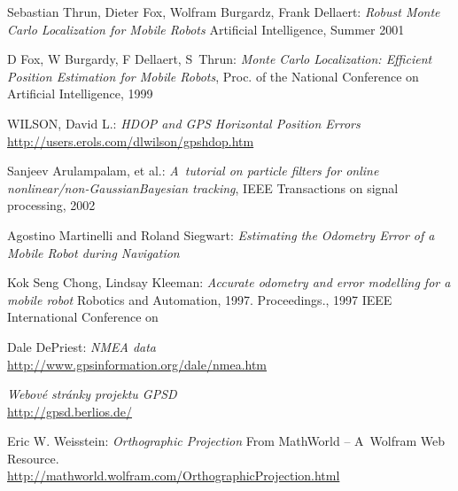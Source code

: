 \clearpage
{}
\begin{thebibliography}{99}

Sebastian Thrun, Dieter Fox, Wolfram Burgardz, Frank Dellaert:
\emph{Robust Monte Carlo Localization for Mobile Robots}
Artificial Intelligence, Summer 2001

D Fox, W Burgardy, F Dellaert, S~Thrun:
{\em Monte Carlo Localization: Efficient Position Estimation for Mobile Robots},
Proc. of the National Conference on Artificial Intelligence, 1999

WILSON, David L.:
\emph{HDOP and GPS Horizontal Position Errors} \\
\url{http://users.erols.com/dlwilson/gpshdop.htm}

Sanjeev Arulampalam, et al.:
{\em A~tutorial on particle filters for online nonlinear/non-GaussianBayesian tracking},
IEEE Transactions on signal processing, 2002

Agostino Martinelli and Roland Siegwart:
\emph{Estimating the Odometry Error of a Mobile Robot during Navigation}

Kok Seng Chong, Lindsay Kleeman:
\emph{Accurate odometry and error modelling for a mobile robot}
Robotics and Automation, 1997. Proceedings., 1997 IEEE International Conference on

Dale DePriest:
\emph{NMEA data} \\
\url{http://www.gpsinformation.org/dale/nmea.htm}

\emph{Webové stránky projektu GPSD} \\
\url{http://gpsd.berlios.de/}

Eric W. Weisstein:
\emph{Orthographic Projection}
From MathWorld -- A~Wolfram Web Resource. \\
\url{http://mathworld.wolfram.com/OrthographicProjection.html}

\end{thebibliography}

